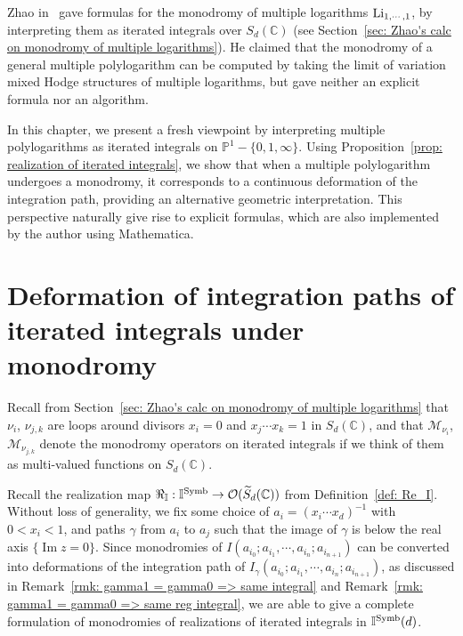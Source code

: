 Zhao in~\cite{Zhao_MultipleZetaFunctionsMultiplePolylogarithmsAndTheirSpecialValues} gave formulas for the monodromy of multiple logarithms $\operatorname{Li}_{1,\cdots,1}$, by interpreting them as iterated integrals over $S_d(\mathbb C)$ (see Section~\ref{sec: Zhao's calc on monodromy of multiple logarithms}). He claimed that the monodromy of a general multiple polylogarithm can be computed by taking the limit of variation mixed Hodge structures of multiple logarithms, but gave neither an explicit formula nor an algorithm.

In this chapter, we present a fresh viewpoint by interpreting multiple polylogarithms as iterated integrals on $\mathbb P^1-\{0,1,\infty\}$. Using Proposition~\ref{prop: realization of iterated integrals}, we show that when a multiple polylogarithm undergoes a monodromy, it corresponds to a continuous deformation of the integration path, providing an alternative geometric interpretation. This perspective naturally give rise to explicit formulas, which are also implemented by the author using Mathematica.

\section{Deformation of integration paths of iterated integrals under monodromy}

Recall from Section~\ref{sec: Zhao's calc on monodromy of multiple logarithms} that $\nu_i$, $\nu_{j,k}$ are loops around divisors $x_i=0$ and $x_j\cdots x_k=1$ in $S_d(\mathbb C)$, and that $\mathcal M_{\nu_i}$, $\mathcal M_{\nu_{j,k}}$ denote the monodromy operators on iterated integrals if we think of them as multi-valued functions on $S_d(\mathbb C)$.

Recall the realization map $\Re_{\mathbb I}:\mathbb I^{\operatorname{Symb}}\to\mathcal O(\widetilde S_d(\mathbb C))$ from Definition~\ref{def: Re_I}. Without loss of generality, we fix some choice of $a_i=(x_i\cdots x_d)^{-1}$ with $0<x_i<1$, and paths $\gamma$ from $a_i$ to $a_j$ such that the image of $\gamma$ is below the real axis $\{\operatorname{Im} z=0\}$. Since monodromies of $I(a_{i_0};a_{i_1},\cdots,a_{i_n};a_{i_{n+1}})$ can be converted into deformations of the integration path of $I_\gamma(a_{i_0};a_{i_1},\cdots,a_{i_n};a_{i_{n+1}})$, as discussed in Remark~\ref{rmk: gamma1 = gamma0 => same integral} and Remark~\ref{rmk: gamma1 = gamma0 => same reg integral}, we are able to give a complete formulation of monodromies of realizations of iterated integrals in $\mathbb I^{\operatorname{Symb}}(d)$.

